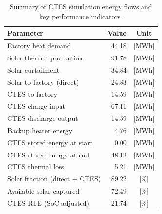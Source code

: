 \renewcommand{\arraystretch}{1.2}
\begin{table}[h]
\centering
\begin{tabular}{l|r c}
\hline
Parameter & Value & Unit \\
\hline
Factory heat demand & 44.18 & [MWh] \\
Solar thermal production & 91.78 & [MWh] \\
Solar curtailment & 34.84 & [MWh] \\
Solar to factory (direct) & 24.83 & [MWh] \\
CTES to factory & 14.59 & [MWh] \\
CTES charge input & 67.11 & [MWh] \\
CTES discharge output & 14.59 & [MWh] \\
Backup heater energy & 4.76 & [MWh] \\
CTES stored energy at start & 0.00 & [MWh] \\
CTES stored energy at end & 48.12 & [MWh] \\
CTES thermal loss & 5.21 & [MWh] \\
\hline
Solar fraction (direct + CTES) & 89.22 & [\%] \\
Available solar captured & 72.49 & [\%] \\
CTES RTE (SoC-adjusted) & 21.74 & [\%] \\
\hline
\end{tabular}
\caption{Summary of CTES simulation energy flows and key performance indicators.}
\label{tab:ctes-simulation-summary}
\end{table}
